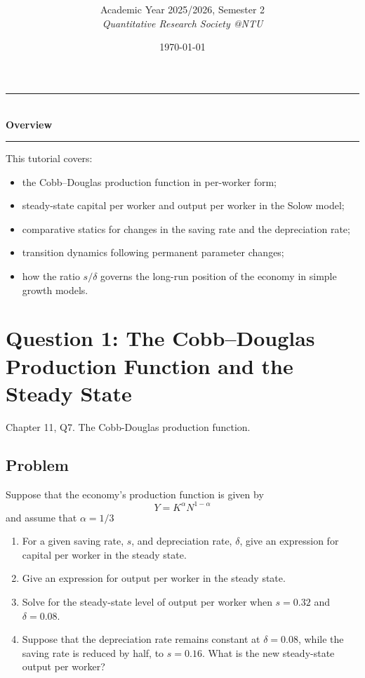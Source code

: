 \documentclass[12pt]{article}
\title{
\CourseCode \CourseName \\[0.3em]
\large \DocType
}
\author{
  Academic Year 2025/2026, Semester 2 \\[0.25em]
  \textit{Quantitative Research Society @NTU}
}
\date{\today}
\begin{document}
\maketitle
\thispagestyle{plainfirst}
\pagestyle{main}
\bigskip

\begin{center}
  \rule{0.8\textwidth}{0.4pt}\\[4pt]
  \textbf{Overview}\\[2pt]
  \rule{0.8\textwidth}{0.4pt}
\end{center}

\noindent
This tutorial covers:
\begin{itemize}[leftmargin=*]
  \item the Cobb--Douglas production function in per-worker form;
  \item steady-state capital per worker and output per worker in the Solow model;
  \item comparative statics for changes in the saving rate and the depreciation rate;
  \item transition dynamics following permanent parameter changes;
  \item how the ratio \(s/\delta\) governs the long-run position of the economy in simple growth models.
\end{itemize}

\bigskip

\newpage
\tableofcontents

\newpage
\section{Question 1: The Cobb--Douglas Production Function and the Steady State}

\noindent
Chapter 11, Q7. The Cobb-Douglas production function.

\subsection{Problem}
Suppose that the economy’s production function is given by
\[
Y = K^\alpha N^{1-\alpha}
\]
and assume that \(\alpha = 1/3\)

\begin{enumerate}[label=(\alph*)]
    \item For a given saving rate, \(s\), and depreciation rate, \(\delta\), give an expression for capital per worker in the steady state.
    \item Give an expression for output per worker in the steady state.
    \item Solve for the steady-state level of output per worker when \(s = 0.32\) and \(\delta = 0.08\).
    \item Suppose that the depreciation rate remains constant at \(\delta = 0.08\), while the saving rate is reduced by half, to \(s = 0.16\). What is the new steady-state output per worker?
\end{enumerate}
\end{document}
